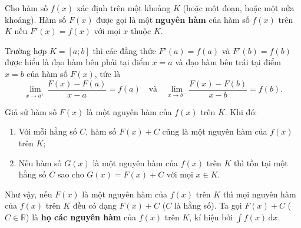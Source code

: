 
\lithuyet

\begin{dinhnghia}
Cho hàm số $f(x)$ xác định trên một khoảng $K$ (hoặc một đoạn, hoặc một nửa khoảng). Hàm số $F(x)$ được gọi là một \textbf{nguyên hàm} của hàm số $f(x)$ trên $K$ nếu $F'(x)=f(x)$ với mọi $x$ thuộc $K$.
\end{dinhnghia}

\begin{chuy}
Trường hợp $K=[a;b]$ thì các đẳng thức $F'(a)=f(a)$ và $F'(b)=f(b)$ được hiểu là đạo hàm bên phải tại điểm $x=a$ và đạo hàm bên trái tại điểm $x=b$ của hàm số $F(x)$, tức là
\[\lim_{x\to a^+}\frac{F(x)-F(a)}{x-a}=f(a)\quad\text{và}\quad\lim_{x\to b^-}\frac{F(x)-F(b)}{x-b}=f(b).\]
\end{chuy}

\begin{dinhli}
Giả sử hàm số $F(x)$ là một nguyên hàm của $f(x)$ trên $K$. Khi đó:
\begin{enumerate}[label=\alph*)]
  \item Với mỗi hằng số $C$, hàm số $F(x)+C$ cũng là một nguyên hàm của $f(x)$ trên $K$;
  \item Nếu hàm số $G(x)$ là một nguyên hàm của $f(x)$ trên $K$ thì tồn tại một hằng số $C$ sao cho $G(x)=F(x)+C$ với mọi $x\in K$.
\end{enumerate}
Như vậy, nếu $F(x)$ là một nguyên hàm của $f(x)$ trên $K$ thì mọi nguyên hàm của $f(x)$ trên $K$ đều có dạng $F(x)+C$ ($C$ là hằng số). Ta gọi $F(x)+C$ ($C\in\mathbb R$) là \textbf{họ các nguyên hàm} của $f(x)$ trên $K$, kí hiệu bởi $\displaystyle\int f(x)\,\mathrm dx$.
\end{dinhli}

